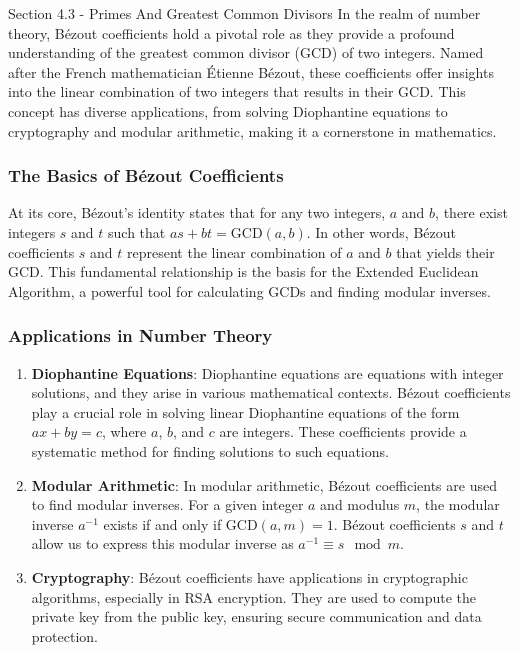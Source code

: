 \begin{notes}{Section 4.3 - Primes And Greatest Common Divisors}
    In the realm of number theory, Bézout coefficients hold a pivotal role as they provide a profound understanding of the greatest common divisor (GCD) of two integers. Named after the French 
    mathematician Étienne Bézout, these coefficients offer insights into the linear combination of two integers that results in their GCD. This concept has diverse applications, from solving Diophantine 
    equations to cryptography and modular arithmetic, making it a cornerstone in mathematics.

    \subsubsection*{The Basics of Bézout Coefficients}

    At its core, Bézout's identity states that for any two integers, \(a\) and \(b\), there exist integers \(s\) and \(t\) such that \(as + bt = \text{GCD}(a, b)\). In other words, Bézout coefficients 
    \(s\) and \(t\) represent the linear combination of \(a\) and \(b\) that yields their GCD. This fundamental relationship is the basis for the Extended Euclidean Algorithm, a powerful tool for 
    calculating GCDs and finding modular inverses.

    \subsubsection*{Applications in Number Theory}

    \begin{enumerate}
        \item \textbf{Diophantine Equations}: Diophantine equations are equations with integer solutions, and they arise in various mathematical contexts. Bézout coefficients play a crucial role in 
        solving linear Diophantine equations of the form \(ax + by = c\), where \(a\), \(b\), and \(c\) are integers. These coefficients provide a systematic method for finding solutions to such equations.
        \item \textbf{Modular Arithmetic}: In modular arithmetic, Bézout coefficients are used to find modular inverses. For a given integer \(a\) and modulus \(m\), the modular inverse \(a^{-1}\) exists 
        if and only if \(\text{GCD}(a, m) = 1\). Bézout coefficients \(s\) and \(t\) allow us to express this modular inverse as \(a^{-1} \equiv s \mod m\).
        \item \textbf{Cryptography}: Bézout coefficients have applications in cryptographic algorithms, especially in RSA encryption. They are used to compute the private key from the public key, 
        ensuring secure communication and data protection.
    \end{enumerate}


\end{notes}
